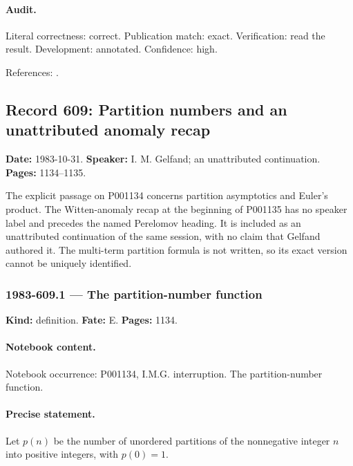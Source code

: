 \paragraph{Audit.} Literal correctness: correct. Publication match: exact. Verification: read the result. Development: annotated. Confidence: high.

\noindent References: \citep{macdonald1995symmetric}.\par

\subsection{Record 609: Partition numbers and an unattributed anomaly recap}

\label{talk:609}

\noindent\textbf{Date:} 1983-10-31. \textbf{Speaker:} I. M. Gelfand; an unattributed continuation. \textbf{Pages:} 1134--1135.\par

The explicit  passage on P001134 concerns partition asymptotics and Euler's product. The Witten-anomaly recap at the beginning of P001135 has no speaker label and precedes the named Perelomov heading. It is included as an unattributed continuation of the same session, with no claim that Gelfand authored it. The multi-term partition formula is not written, so its exact version cannot be uniquely identified.

\subsubsection{1983-609.1 --- The partition-number function}

\label{item:1983-609.1}

\noindent\textbf{Kind:} definition. \textbf{Fate:} E. \textbf{Pages:} 1134.\par

\paragraph{Notebook content.} Notebook occurrence: P001134, I.M.G. interruption. The partition-number function.

\paragraph{Precise statement.} Let \(p(n)\) be the number of unordered partitions of the nonnegative integer \(n\) into positive integers, with \(p(0)=1\).

